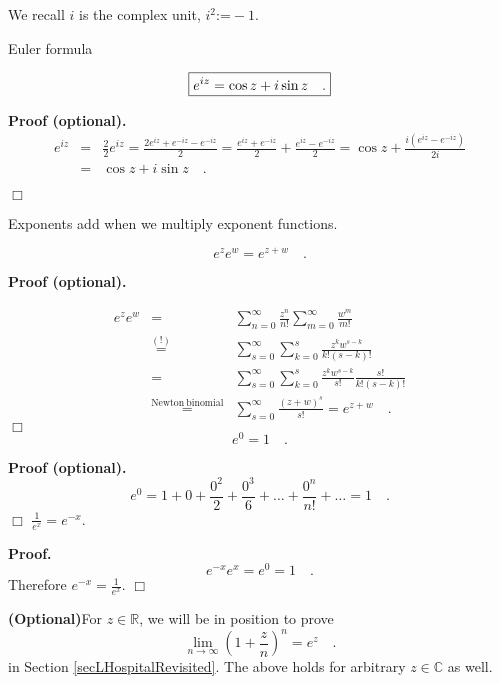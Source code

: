 \documentclass[12pt]{book}
\newcommand{\eqdef}{\textbf{:=}}
\newcommand{\eqAttention}{\stackrel{(!)}{=}}
\newcommand{\importantFormula}[1]{\begin{equation} \boxed{#1} \end{equation}}
\newenvironment{proof}[1][]{ \textbf{Proof#1.} }{$\Box$\medskip}
\newenvironment{proofOptional}[1][]{ \textbf{Proof (optional).}}{$\Box$\medskip}
\newcommand{\optionalMaterial}{\textbf{(Optional)}}
\begin{document}
We recall $i$ is the complex unit, $i^2\eqdef -1$.

Euler formula

\importantFormula{\label{eqEulerExp}
e^{iz}= \cos z+ i\sin z \quad .
}

\begin{proofOptional}
\[
\begin{array}{rcl}
e^{iz}&=& \frac{2}{2}e^{iz}= \frac{2e^{iz} + e^{-iz} - e^{-iz}}{2} = \frac{e^{iz}+e^{-iz}}2 +\frac{e^{iz}-e^{-iz}}2= \cos z + \frac{i(e^{iz}-e^{-iz})}{2i}\\&=& \cos z+i \sin z\quad .

\end{array}
\]

\end{proofOptional}


Exponents add when we multiply exponent functions.

\importantFormula{
e^{z} e^{w}=e^{z+w}\quad .
}

\begin{proofOptional}

\begin{equation*}
\begin{array}{rcl}
\displaystyle
e^{z} e^w&=&\sum_{n=0}^{\infty} \frac{z^n}{n!}\sum_{m=0}^{\infty} \frac{w^m}{m!} \\ &\eqAttention& \sum_{s=0}^{\infty}\sum_{k=0 }^s \frac{z^{k}w^{s-k}}{k! (s-k)!} \\ &=& \sum_{s=0}^{\infty}\sum_{k=0 }^s  \frac{z^{k}w^{s-k}}{s!}\frac{s!}{k! (s-k)!}\\ &\stackrel{\mathrm{Newton~binomial}}{=}&\sum_{s=0}^{\infty} \frac{(z+w)^s}{s!}=e^{z+w}\quad .
\end{array}
\end{equation*}
\end{proofOptional}
\[
e^0=1\quad .
\]

\begin{proofOptional}
\[ e^0 = 1+ 0+ \frac{0^2}{2}+ \frac{0^3}{6}+\dots +\frac{0^n}{n!}+\dots = 1\quad .
\]
\end{proofOptional}
$\frac{1}{e^{x}}= e^{-x}$\quad .

\begin{proof}
\[e^{-x}e^x=e^0 = 1\quad .
\]
Therefore $e^{-x}=\frac{1}{e^x}.$
\end{proof}

\optionalMaterial For $z\in \mathbb R$, we will be in position to prove  
\begin{equation}\label{eq(1+x/n)^n=e^x}
\lim_{n\to \infty} \left(1+\frac{z}n\right)^n= e^z\quad .
\end{equation}
in Section \ref{secLHospitalRevisited}. The above holds for arbitrary $z\in \mathbb C$ as well.
\end{document}
